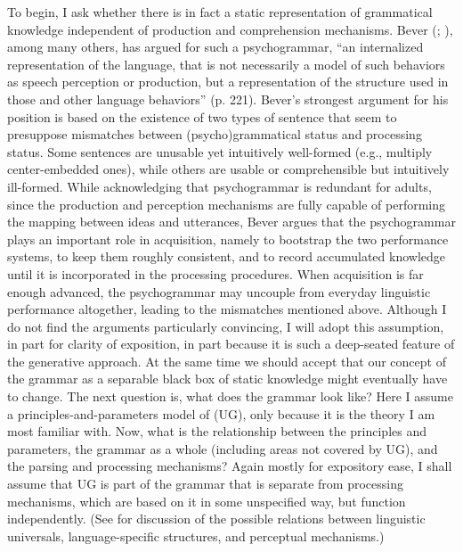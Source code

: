 To begin, I ask whether there is in fact a static representation of grammatical knowledge independent of production and comprehension mechanisms. Bever (\citet{Bever1975b}; \citet{LachterEtAl1988}), among many others, has argued for such a psychogrammar, ``an internalized representation of the language, that is not necessarily a model of such behaviors as speech perception or production, but a representation of the structure used in those and other language behaviors'' (p. 221). Bever's strongest argument for his position is based on the existence of two types of sentence that seem to presuppose mismatches between (psycho)grammatical status and processing status. Some sentences are unusable yet intuitively well-formed (e.g., multiply center-embedded ones), while others are usable or comprehensible but intuitively ill-formed. While acknowledging that psychogrammar is redundant for adults, since the production and perception mechanisms are fully capable of performing the mapping between ideas and utterances, Bever argues that the psychogrammar plays an important role in acquisition, namely to bootstrap the two performance systems, to keep them roughly consistent, and to record accumulated knowledge until it is incorporated in the processing procedures. When acquisition is far enough advanced, the psychogrammar may uncouple from everyday linguistic performance altogether, leading to the mismatches mentioned above. Although I do not find the arguments particularly convincing, I will adopt this assumption, in part for clarity of exposition, in part because it is such a deep-seated feature of the generative approach. At the same time we should accept that our concept of the grammar as a separable black box of static knowledge might eventually have to change. The next question is, what does the grammar look like? Here I assume a principles-and-parameters model of  (UG), only because it is the theory I am most familiar with. Now, what is the relationship between the principles and parameters, the grammar as a whole (including areas not covered by UG), and the parsing and processing mechanisms? Again mostly for expository ease, I shall assume that UG is part of the grammar that is separate from processing mechanisms, which are based on it in some unspecified way, but function independently. (See \citet{GerkenEtAl1986} for discussion of the possible relations between linguistic universals, language-specific structures, and perceptual mechanisms.)

